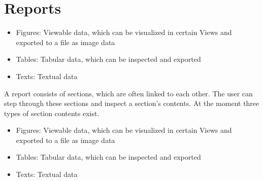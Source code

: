 \section{Reports}





\begin{itemize}  
    \item Figures: Viewable data, which can be visualized in certain Views and exported to a file as image data
    \item Tables: Tabular data, which can be inspected and exported
    \item Texts: Textual data
\end{itemize}


A report consists of sections, which are often linked to each other.
The user can step through these sections and inspect a section's contents.
At the moment three types of section contents exist.

\begin{itemize}  
    \item Figures: Viewable data, which can be visualized in certain Views and exported to a file as image data
    \item Tables: Tabular data, which can be inspected and exported
    \item Texts: Textual data
\end{itemize}
\ \\

